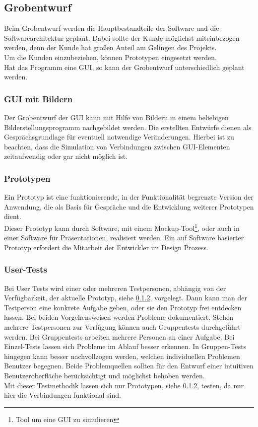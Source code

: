 \subsection{Grobentwurf}
Beim Grobentwurf werden die Hauptbestandteile der Software und die Softwarearchitektur geplant. Dabei sollte der Kunde möglichst miteinbezogen werden, denn der Kunde hat großen Anteil am Gelingen des Projekts\cite{10.1145/1060710.1060712}. \\
Um die Kunden einzubeziehen, können Prototypen eingesetzt werden.\\
Hat das Programm eine \ac{GUI}, so kann der Grobentwurf unterschiedlich geplant werden. \\
\subsubsection{GUI mit Bildern}
\label{GUI mit Bildern}
Der Grobentwurf der \ac{GUI} kann mit Hilfe von Bildern in einem beliebigen Bilderstellungsprogramm nachgebildet werden. Die erstellten Entwürfe dienen als Gesprächsgrundlage für eventuell notwendige Veränderungen. Hierbei ist zu beachten, dass die Simulation von Verbindungen zwischen \ac{GUI}-Elementen zeitaufwendig oder gar nicht möglich ist.
\subsubsection{Prototypen}
\label{Prototypen}
Ein Prototyp ist eine funktionierende, in der Funktionalität begrenzte Version der Anwendung, die als Basis für Gespräche und die Entwicklung weiterer Prototypen dient\cite{budde1992prototyping}. \\
Dieser Prototyp kann durch Software, mit einem Mockup-Tool\footnote{Tool um eine \ac{GUI} zu simulieren}, oder auch in einer Software für Präsentationen, realisiert werden. Ein auf Software basierter Prototyp erfordert die Mitarbeit der Entwickler im Design Prozess. 
\subsubsection{User-Tests}
\label{User-Tests}
Bei User Tests wird einer oder mehreren Testpersonen, abhängig von der Verfügbarkeit, der aktuelle Prototyp, siehe \ref{Prototypen}, vorgelegt. Dann kann man der Testperson eine konkrete Aufgabe geben, oder sie den Prototyp frei entdecken lassen. Bei beiden Vorgehensweisen werden Probleme dokumentiert. Stehen mehrere Testpersonen zur Verfügung können auch Gruppentests durchgeführt werden. Bei Gruppentests arbeiten mehrere Personen an einer Aufgabe. Bei Einzel-Tests lassen sich Probleme im Ablauf besser erkennen. In Gruppen-Tests hingegen kann besser nachvollzogen werden, welchen individuellen Problemen Benutzer begegnen\cite{BASTIEN2010e18}. Beide Problemquellen sollten für den Entwurf einer intuitiven Benutzeroberfläche berücksichtigt und möglichst behoben werden. \\
Mit dieser Testmethodik lassen sich nur Prototypen, siehe \ref{Prototypen}, testen, da nur hier die Verbindungen funktional sind.
